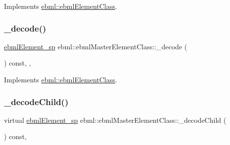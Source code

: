 Implements \mbox{\hyperlink{classebml_1_1ebmlElementClass_aa6bf675de4918fd7b553d141871a2ede}{ebml\+::ebml\+Element\+Class}}.

\mbox{\label{classebml_1_1ebmlMasterElementClass_aeda43063d78233403fa084800ff9c109}} 
\subsubsection{\texorpdfstring{\+\_\+decode()}{\_decode()}\hspace{0.1cm}{\footnotesize\ttfamily [2/2]}}
{\footnotesize\ttfamily \mbox{\hyperlink{namespaceebml_adad533b7705a16bb360fe56380c5e7be}{ebml\+Element\+\_\+sp}} ebml\+::ebml\+Master\+Element\+Class\+::\+\_\+decode (\begin{DoxyParamCaption}\item[{const \mbox{\hyperlink{classebml_1_1parseFile}{parse\+File}} \&}]{ }\end{DoxyParamCaption}) const\hspace{0.3cm}{\ttfamily [override]}, {\ttfamily [protected]}, {\ttfamily [virtual]}}



Implements \mbox{\hyperlink{classebml_1_1ebmlElementClass_aedbfff5909af215acaa3ca28643f1bc9}{ebml\+::ebml\+Element\+Class}}.

\mbox{\label{classebml_1_1ebmlMasterElementClass_a20fcd3470130b32bf42317ccb45d6deb}} 
\subsubsection{\texorpdfstring{\+\_\+decode\+Child()}{\_decodeChild()}\hspace{0.1cm}{\footnotesize\ttfamily [1/2]}}
{\footnotesize\ttfamily virtual \mbox{\hyperlink{namespaceebml_adad533b7705a16bb360fe56380c5e7be}{ebml\+Element\+\_\+sp}} ebml\+::ebml\+Master\+Element\+Class\+::\+\_\+decode\+Child (\begin{DoxyParamCaption}\item[{const \mbox{\hyperlink{classebml_1_1parseString}{parse\+String}} \&}]{ }\end{DoxyParamCaption}) const\hspace{0.3cm}{\ttfamily [protected]}, {\ttfamily [virtual]}}

